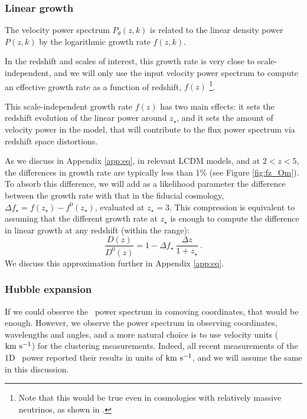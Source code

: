 \subsubsection{Linear growth}

The velocity power spectrum $P_\theta(z,k)$ is related to the linear density
power $P(z,k)$ by the logarithmic growth rate $f(z,k)$.

In the redshift and scales of interest, this growth rate is very close
to scale-independent, and we will only use the input velocity power spectrum
to compute an effective growth rate as a function of redshift, $f(z)$
\footnote{Note that this would be true even in cosmologies with relatively
massive neutrinos, as shown in \cite{Viel2010,Pedersen2018}.
}.

This scale-independent growth rate $f(z)$ has two main effects: it sets
the redshift evolution of the linear power around $z_\star$, and it sets
the amount of velocity power in the model, that will contribute to the flux
power spectrum via redshift space distortions.

As we discuss in Appendix \ref{app:eq}, in relevant LCDM models, and at
$2 < z < 5$, the differences in growth rate are typically less than 1\%
(see Figure \ref{fig:fz_Om}).
To absorb this difference, we will add as a likelihood parameter the 
difference between the growth rate with that in the fiducial cosmology, 
$\Delta f_\star = f(z_\star) - f^0(z_\star)$, evaluated at $z_\star=3$. 
This compression is equivalent to assuming that the different growth rate
at $z_\star$ is enough to compute the difference in linear growth at any
redshift (within the range):
\begin{equation}\label{eq:growth}
 \frac{D(z)}{D^0(z)} = 1 - \Delta f_\star ~ \frac{\Delta z}{1 + z_\star} ~.
\end{equation} 
We discuss this approximation further in Appendix \ref{app:eq}.

\subsubsection{Hubble expansion}

If we could observe the \lya\ power spectrum in comoving coordinates, that 
would be enough. 
However, we observe the power spectrum in observing coordinates, wavelengths
and angles, and a more natural choice is to use velocity units (${\rm km~s^{-1}}$) for 
the clustering measurements. 
Indeed, all recent measurements of the 1D \lya\ power reported their results
in units of ${\rm km~s^{-1}}$, and we will assume the same in this discussion.


